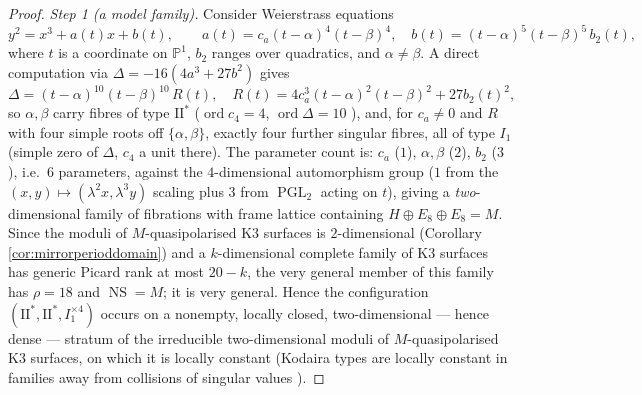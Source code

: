 \documentclass[11pt]{amsart}
\theoremstyle{plain}
\theoremstyle{definition}
\newcommand{\Pn}{\mathbb{P}^1}
\newcommand{\NS}{\operatorname{NS}}
\begin{document}
\begin{proof}
\emph{Step 1 (a model family).} Consider Weierstrass equations
\begin{equation}\label{eq:weierstrass}
y^2=x^3+a(t)x+b(t),\qquad
a(t)=c_a(t-\alpha)^4(t-\beta)^4,\quad
b(t)=(t-\alpha)^5(t-\beta)^5\,b_2(t),
\end{equation}
where $t$ is a coordinate on $\Pn$, $b_2$ ranges over quadratics, and
$\alpha\neq\beta$. A direct computation via
$\Delta=-16(4a^3+27b^2)$ gives
\[
\Delta=(t-\alpha)^{10}(t-\beta)^{10}\,R(t),\quad
R(t)=4c_a^3(t-\alpha)^2(t-\beta)^2+27b_2(t)^2,
\]
so $\alpha,\beta$ carry fibres of type $\mathrm{II}^*$
($\operatorname{ord}c_4=4$, $\operatorname{ord}\Delta=10$
\cite{Kod63,Mir89}), and, for $c_a\neq0$ and $R$ with four simple roots
off $\{\alpha,\beta\}$, exactly four further singular fibres, all of type
$I_1$ (simple zero of $\Delta$, $c_4$ a unit there). The parameter count is:
$c_a$ ($1$), $\alpha,\beta$ ($2$), $b_2$ ($3$), i.e.\ $6$ parameters, against
the $4$-dimensional automorphism group ($1$ from the
$(x,y)\mapsto(\lambda^2x,\lambda^3y)$ scaling plus $3$ from
$\operatorname{PGL}_2$ acting on $t$), giving a
\emph{two}-dimensional family of fibrations with frame lattice containing
$H\oplus E_8\oplus E_8=M$. Since the moduli of $M$-quasipolarised K3 surfaces is
$2$-dimensional (Corollary \ref{cor:mirrorperioddomain}) and a $k$-dimensional
complete family of K3 surfaces has generic Picard rank at most $20-k$, the very
general member of this family has $\rho=18$ and $\NS=M$; it is very general.
Hence the configuration $(\mathrm{II}^*,\mathrm{II}^*,I_1^{\times4})$ occurs on
a nonempty, locally closed, two-dimensional --- hence dense --- stratum of the
irreducible two-dimensional moduli of $M$-quasipolarised K3 surfaces, on which
it is locally constant (Kodaira types are locally constant in families away
from collisions of singular values \cite{Mir89,Per85}).


\end{proof}
\end{document}
